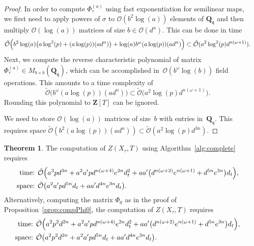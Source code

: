 \documentclass[a4paper,11pt]{article}
\numberwithin{equation}{section}
\newcommand{\ZZ}{\mathbf{Z}} %
\newcommand{\QQ}{\mathbf{Q}} %
\providecommand{\BigOh}{\mathcal{O}}          %
\providecommand{\SoftOh}{\tilde{\mathcal{O}}} %
\theoremstyle{definition}
\newtheorem{thm}{Theorem}[section]
\begin{document}
\begin{proof}
In order to compute $\Phi_{\tau}^{(a)}$ using fast exponentiation for 
semilinear maps, we first need to apply powers of $\sigma$ to $\BigOh(b^2 \log(a))$ 
elements of $\QQ_{\mathfrak{q}}$ and then multiply $\BigOh(\log (a))$ matrices 
of size $b \in \BigOh(d^n)$. This can be done in time 
\begin{gather*}
\SoftOh\Bigl( b^2 \log(a) \bigl( a \log^2(p) + (a \log(p))(a d^n)  \bigr) 
    + \log(a) b^{\omega} (a \log(p))(a d^n)  \Bigr) 
\subset \SoftOh(a^2 \log^2(p) d^{n(\omega+1)}).
\end{gather*}
Next, we compute the reverse characteristic polynomial of matrix 
$\Phi_{\tau}^{(a)} \in M_{b \times b}(\QQ_{\mathfrak{q}})$, which 
can be accomplished in~$\BigOh(b^{\omega} \log(b))$ field operations. 
This amounts to a time complexity of 
\begin{equation*}
\SoftOh\bigl(b^{\omega} (a \log(p))(a d^n) \bigr)
    \subset \SoftOh\bigl( a^2 \log(p) d^{n(\omega+1)} \bigr).
\end{equation*}
Rounding this polynomial to $\ZZ[T]$ can be ignored.

We need to store $\BigOh(\log(a))$ matrices of size~$b$ with entries 
in~$\QQ_{\mathfrak{q}}$.  This requires space 
$\SoftOh(b^2 (a \log(p)) (a d^n)) \subset \SoftOh(a^2 \log(p) d^{3n})$.
\end{proof}

\begin{thm}
The computation of $Z(X_{\tau},T)$ using Algorithm~\ref{alg:complete} requires
\begin{align*}
\mbox{time: }  &\SoftOh\Bigl( 
                a^3 p d^{3n} + 
                a^2 a' p d^{n(\omega+4)} e^{2n} d_t^2+
                aa' \bigl(d^{n(\omega+2)} e^{n(\omega+1)}+ d^{5n} e^{3n}\bigr) d_t 
                \Bigr), \\
\mbox{space: } &\SoftOh\bigl( a^2 a' p d^{5n} d_t + a a' d^{4n} e^{3n} d_t \bigr).
\end{align*}
Alternatively, computing the matrix $\Phi_0$ as in the proof of Proposition~\ref{prop:compPhi0}, 
the computation of $Z(X_{\tau},T)$ requires
\begin{align*}
\mbox{time: }  &\SoftOh\Bigl( 
                a^2 p^2 d^{2n} + 
                a^2 a' p d^{n(\omega+4)} e^{2n} d_t^2+
                aa' \bigl(d^{n(\omega+2)} e^{n(\omega+1)}+ d^{5n} e^{3n}\bigr) d_t 
                \Bigr), \\
\mbox{space: } &\SoftOh\bigl( 
                a^2 p^2 d^{2n} + 
                a^2 a' p d^{5n} d_t + 
                a a' d^{4n} e^{3n} d_t \bigr).
\end{align*}
\end{thm}
\end{document}
